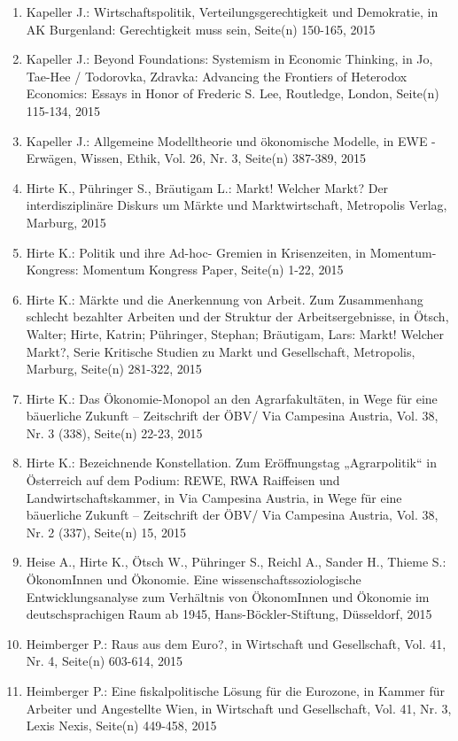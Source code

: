 \begin{enumerate}
	 \item Kapeller J.: Wirtschaftspolitik, Verteilungsgerechtigkeit und Demokratie, in AK Burgenland: Gerechtigkeit muss sein, Seite(n) 150-165, 2015
	 \item Kapeller J.: Beyond Foundations: Systemism in Economic  Thinking, in Jo, Tae-Hee / Todorovka, Zdravka: Advancing the Frontiers of Heterodox Economics: Essays in Honor of Frederic S. Lee, Routledge, London, Seite(n) 115-134, 2015
	 \item Kapeller J.: Allgemeine Modelltheorie und ökonomische Modelle, in EWE - Erwägen, Wissen, Ethik, Vol. 26, Nr. 3, Seite(n) 387-389, 2015
	 \item Hirte K., Pühringer S., Bräutigam L.: Markt! Welcher Markt? Der interdisziplinäre Diskurs um Märkte und Marktwirtschaft, Metropolis Verlag, Marburg, 2015
	 \item Hirte K.: Politik und ihre Ad-hoc- Gremien in Krisenzeiten, in Momentum-Kongress: Momentum Kongress Paper, Seite(n) 1-22, 2015
	 \item Hirte K.: Märkte und die Anerkennung von Arbeit. Zum Zusammenhang schlecht bezahlter Arbeiten und der Struktur der Arbeitsergebnisse, in Ötsch, Walter; Hirte, Katrin; Pühringer, Stephan; Bräutigam, Lars: Markt! Welcher Markt?, Serie Kritische Studien zu Markt und Gesellschaft, Metropolis, Marburg, Seite(n) 281-322, 2015
	 \item Hirte K.: Das Ökonomie-Monopol an den Agrarfakultäten, in Wege für eine bäuerliche Zukunft – Zeitschrift der ÖBV/ Via Campesina Austria, Vol. 38, Nr. 3 (338), Seite(n) 22-23, 2015
	 \item Hirte K.: Bezeichnende Konstellation. Zum Eröffnungstag „Agrarpolitik“ in Österreich auf dem Podium: REWE, RWA Raiffeisen und Landwirtschaftskammer, in Via Campesina Austria, in Wege für eine bäuerliche Zukunft – Zeitschrift der ÖBV/ Via Campesina Austria, Vol. 38, Nr. 2 (337), Seite(n) 15, 2015
	 \item Heise A., Hirte K., Ötsch W., Pühringer S., Reichl A., Sander H., Thieme S.: ÖkonomInnen und Ökonomie. Eine wissenschaftssoziologische Entwicklungsanalyse zum Verhältnis von ÖkonomInnen und Ökonomie im deutschsprachigen Raum ab 1945, Hans-Böckler-Stiftung, Düsseldorf, 2015
	 \item Heimberger P.: Raus aus dem Euro?, in Wirtschaft und Gesellschaft, Vol. 41, Nr. 4, Seite(n) 603-614, 2015
	 \item Heimberger P.: Eine fiskalpolitische Lösung für die Eurozone, in Kammer für Arbeiter und Angestellte Wien, in Wirtschaft und Gesellschaft, Vol. 41, Nr. 3, Lexis Nexis, Seite(n) 449-458, 2015

\end{enumerate}
